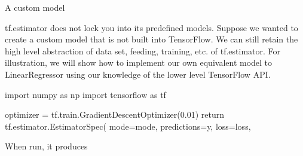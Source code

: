 \documentclass[10pt,a4paper]{ctexbook}
\begin{document}
A custom model

tf.estimator does not lock you into its predefined models. Suppose we wanted to create a custom model that is not built into TensorFlow. We can still retain the high level abstraction of data set, feeding, training, etc. of tf.estimator. For illustration, we will show how to implement our own equivalent model to LinearRegressor using our knowledge of the lower level TensorFlow API.


import numpy as np
import tensorflow as tf

  optimizer = tf.train.GradientDescentOptimizer(0.01)
  return tf.estimator.EstimatorSpec(
      mode=mode,
      predictions=y,
      loss=loss,


When run, it produces
\end{document}
